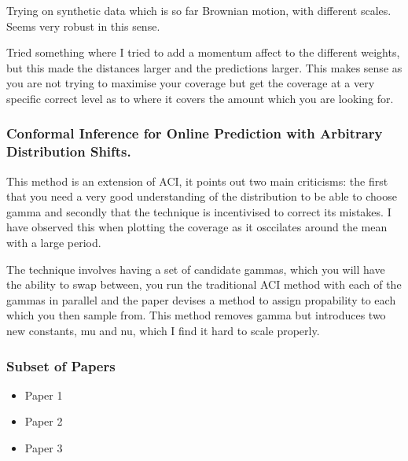 \documentclass{article}
\begin{document}
Trying on synthetic data which is so far Brownian motion, with different scales. Seems very robust in this sense.

Tried something where I tried to add a momentum affect to the different weights, but this made the distances larger and the predictions larger. This makes sense as you are not trying to maximise your coverage but get the coverage at a very specific correct level as to where it covers the amount which you are looking for.

\subsubsection{Conformal Inference for Online Prediction with Arbitrary Distribution Shifts.}
\cite{gibbs2024conformal}

This method is an extension of ACI, it points out two main criticisms: the first that you need a very good understanding of the distribution to be able to choose gamma and secondly that the technique is incentivised to correct its mistakes. I have observed this when plotting the coverage as it osccilates around the mean with a large period.

The technique involves having a set of candidate gammas, which you will have the ability to swap between, you run the traditional ACI method with each of the gammas in parallel and the paper devises a method to assign propability to each which you then sample from. This method removes gamma but introduces two new constants, mu and nu, which I find it hard to scale properly. 

\subsubsection{Subset of Papers}
\begin{itemize}
    \item Paper 1
    \item Paper 2
    \item Paper 3
\end{itemize}



\end{document}
